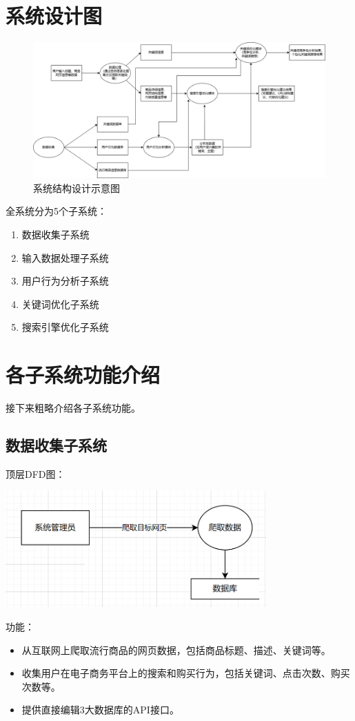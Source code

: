 \documentclass[11pt, a4paper, oneside]{ctexbook}
\begin{document}
\section{系统设计图}
\begin{figure}[h]
    \centering
    \includegraphics[width=1\textwidth]{系统结构设计1.png}
    \caption{系统结构设计示意图}
    \label{fig:example}
\end{figure}

全系统分为5个子系统：
\begin{enumerate}[itemsep=-5pt]
    \item 数据收集子系统
    \item 输入数据处理子系统
    \item 用户行为分析子系统
    \item 关键词优化子系统
    \item 搜索引擎优化子系统
\end{enumerate}
\section{各子系统功能介绍}
接下来粗略介绍各子系统功能。
\subsection{数据收集子系统}
顶层DFD图：

\includegraphics[width=0.75\textwidth]{数据收集系统2_1.png}

功能：
\begin{itemize}
    \item 从互联网上爬取流行商品的网页数据，包括商品标题、描述、关键词等。
    \item 收集用户在电子商务平台上的搜索和购买行为，包括关键词、点击次数、购买次数等。
    \item 提供直接编辑3大数据库的API接口。
\end{itemize}
\end{document}
